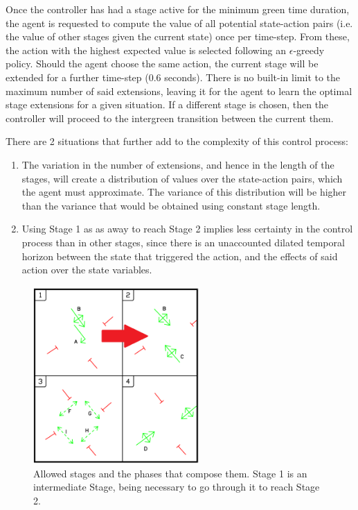 \documentclass[conference]{IEEEtran}
\begin{document}
Once the controller has had a stage active for the minimum green time duration, the agent is requested to compute the value of all potential state-action pairs (i.e. the value of other stages given the current state) once per time-step.
From these, the action with the highest expected value is selected following an $\epsilon$-greedy policy\cite{suttonbarto}.
Should the agent choose the same action, the current stage will be extended for a further time-step (0.6 seconds).
There is no built-in limit to the maximum number of said extensions, leaving it for the agent to learn the optimal stage extensions for a given situation.
If a different stage is chosen, then the controller will proceed to the intergreen transition between the current them.

There are 2 situations that further add to the complexity of this control process:
\begin{enumerate}
\item The variation in the number of extensions, and hence in the length of the stages, will create a distribution of values over the state-action pairs, which the agent must approximate. The variance of this distribution will be higher than the variance that would be obtained using constant stage length.
\item Using Stage 1 as as away to reach Stage 2 implies less certainty in the control process than in other stages, since there is an unaccounted dilated temporal horizon between the state that triggered the action, and the effects of said action over the state variables.
\end{enumerate}

\begin{figure}                                                
\centering                                                    
\includegraphics[width=2.5in]{phases_limited.png}                                    
\caption{Allowed stages and the phases that compose them. Stage 1 is an intermediate Stage, being necessary to go through it to reach Stage 2.}                                  
\label{intersection}                                               
\end{figure}     
\end{document}
